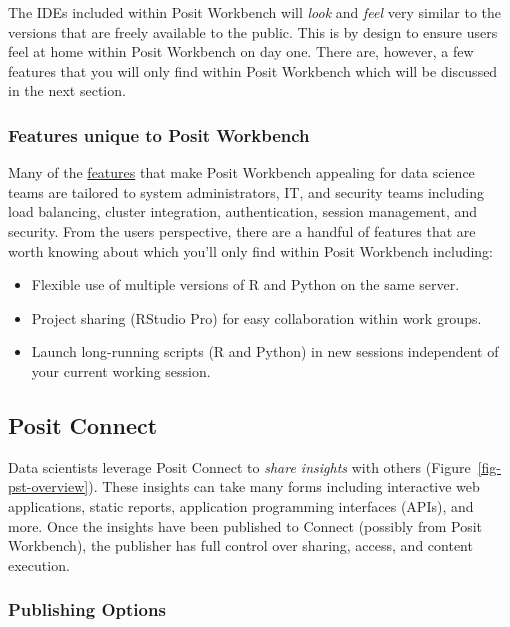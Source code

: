 \documentclass[
  letterpaper,
  DIV=11,
  numbers=noendperiod]{scrreprt}
\begin{document}
The IDEs included within Posit Workbench will \emph{look} and
\emph{feel} very similar to the versions that are freely available to
the public. This is by design to ensure users feel at home within Posit
Workbench on day one. There are, however, a few features that you will
only find within Posit Workbench which will be discussed in the next
section.

\subsubsection{Features unique to Posit
Workbench}\label{features-unique-to-posit-workbench}

Many of the \href{https://docs.posit.co/ide/server-pro/}{features} that
make Posit Workbench appealing for data science teams are tailored to
system administrators, IT, and security teams including load balancing,
cluster integration, authentication, session management, and security.
From the users perspective, there are a handful of features that are
worth knowing about which you'll only find within Posit Workbench
including:

\begin{itemize}
\item
  Flexible use of multiple versions of R and Python on the same server.
\item
  Project sharing (RStudio Pro) for easy collaboration within work
  groups.
\item
  Launch long-running scripts (R and Python) in new sessions independent
  of your current working session.
\end{itemize}

\subsection{Posit Connect}\label{posit-connect}

Data scientists leverage Posit Connect to \emph{share insights} with
others (Figure~\ref{fig-pst-overview}). These insights can take many
forms including interactive web applications, static reports,
application programming interfaces (APIs), and more. Once the insights
have been published to Connect (possibly from Posit Workbench), the
publisher has full control over sharing, access, and content execution.

\subsubsection{Publishing Options}\label{publishing-options}
\end{document}
